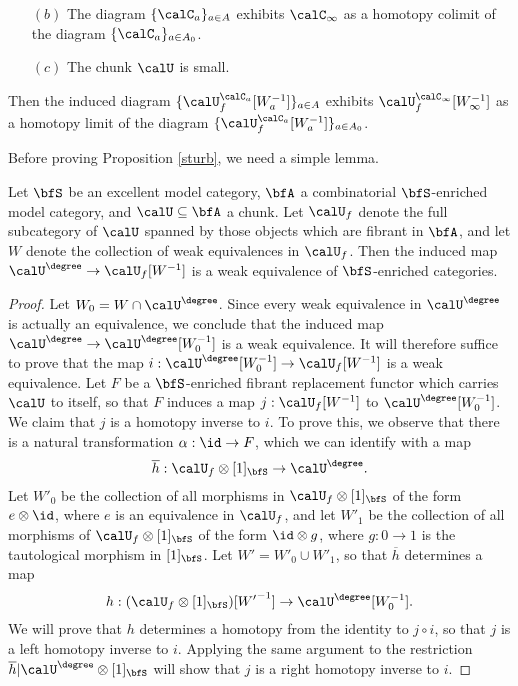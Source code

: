\begin{Simplicial Categories}
\begin{proposition}
\begin{itemize}
\item[$(b)$] The diagram $\{ \calC_{a} \}_{ a \in A}$ exhibits $\calC_{\infty}$ as a
homotopy colimit of the diagram $\{ \calC_{a} \}_{a \in A_0}$. 

\item[$(c)$] The chunk $\calU$ is small.
\end{itemize}

Then the induced diagram $\{ \calU^{\calC_{a}}_{f}[W_{a}^{-1}] \}_{a \in A}$ exhibits
$ \calU^{\calC_{\infty}}_{f}[ W_{\infty}^{-1} ]$ as a homotopy limit of the diagram
$ \{ \calU^{\calC_{a}}_{f}[ W_a^{-1} ] \}_{a \in A_0}$. 
\end{proposition}

Before proving Proposition \ref{sturb}, we need a simple lemma.

\begin{lemma}\label{kur}
Let $\bfS$ be an excellent model category, $\bfA$ a combinatorial $\bfS$-enriched
model category, and $\calU \subseteq \bfA$ a chunk. Let $\calU_{f}$ denote the
full subcategory of $\calU$ spanned by those objects which are fibrant in $\bfA$, and let
$W$ denote the collection of weak equivalences in $\calU_{f}$. Then the induced map
$\calU^{\degree} \rightarrow \calU_{f}[W^{-1}]$ is a weak equivalence of $\bfS$-enriched categories.
\end{lemma}

\begin{proof}
Let $W_0 = W \cap \calU^{\degree}$. Since every weak equivalence in $\calU^{\degree}$
is actually an equivalence, we conclude that the induced map
$\calU^{\degree} \rightarrow \calU^{\degree}[W_0^{-1}]$ is a weak equivalence.
It will therefore suffice to prove that the map
$i: \calU^{\degree}[W_0^{-1}] \rightarrow \calU_{f}[W^{-1}]$ is a weak equivalence.
Let $F$ be a $\bfS$-enriched fibrant replacement functor which carries $\calU$ to itself, so
that $F$ induces a map $j: \calU_{f}[W^{-1}]$ to $\calU^{\degree}[W_0^{-1}]$. We claim that $j$ is a homotopy inverse to $i$. To prove this, we observe that there is a natural transformation
$\alpha: \id \rightarrow F$, which we can identify with a map
$$\overline{h}: \calU_{f} \otimes [1]_{\bfS} \rightarrow \calU^{\degree}.$$
Let $W'_0$ be the collection of all morphisms in $\calU_{f} \otimes [1]_{\bfS}$
of the form $e \otimes \id$, where $e$ is an equivalence in $\calU_{f}$, and let
$W'_1$ be the collection of all morphisms of $\calU_f \otimes [1]_{\bfS}$ of the form
$\id \otimes g$, where $g: 0 \rightarrow 1$ is the tautological morphism in
$[1]_{\bfS}$. Let $W' = W'_0 \cup W'_1$, so that $\overline{h}$ determines a map
$$ h: ( \calU_{f} \otimes [1]_{\bfS} )[{W'}^{-1} ] \rightarrow \calU^{\degree}[W_0^{-1}].$$
We will prove that $h$ determines a homotopy from the identity to $j \circ i$, so that
$j$ is a left homotopy inverse to $i$. Applying the same argument to the
restriction $\overline{h} | \calU^{\degree} \otimes [1]_{\bfS}$ will show that
$j$ is a right homotopy inverse to $i$. 


\end{proof}
\end{Simplicial Categories}
